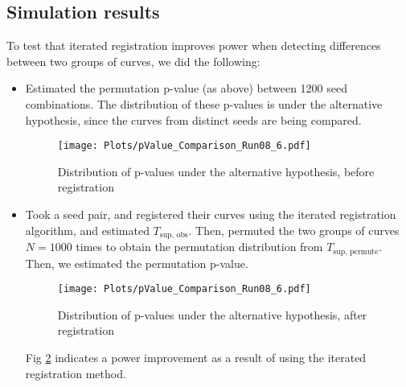 \subsection{Simulation results}
To test that iterated registration improves power when detecting differences between two groups of curves, we did the following:
\begin{itemize}
\item Estimated the permutation p-value (as above) between 1200 seed combinations. The distribution of these p-values is under the alternative hypothesis, since the curves from distinct seeds are being compared.
\begin{figure}[H]
\begin{center}
\texttt{[image: Plots/pValue\_Comparison\_Run08\_6.pdf]}
\end{center}
\caption{Distribution of p-values under the alternative hypothesis, before registration}
\label{fig:BeforeRegist}
\end{figure}

\item Took a seed pair, and registered their curves using the iterated registration algorithm, and estimated $T_{\text{sup, obs}}$. Then, permuted the two groups of curves $N = 1000$ times to obtain the permutation distribution from  $T_{\text{sup, permute}}$. Then, we estimated the permutation p-value. 
\begin{figure}[H]
\begin{center}
\texttt{[image: Plots/pValue\_Comparison\_Run08\_6.pdf]}
\end{center}
\caption{Distribution of p-values under the alternative hypothesis, after registration}
\label{fig:AfterRegist}
\end{figure}

Fig \ref{fig:AfterRegist} indicates a power improvement as a result of using the iterated registration method. 

\end{itemize} 



